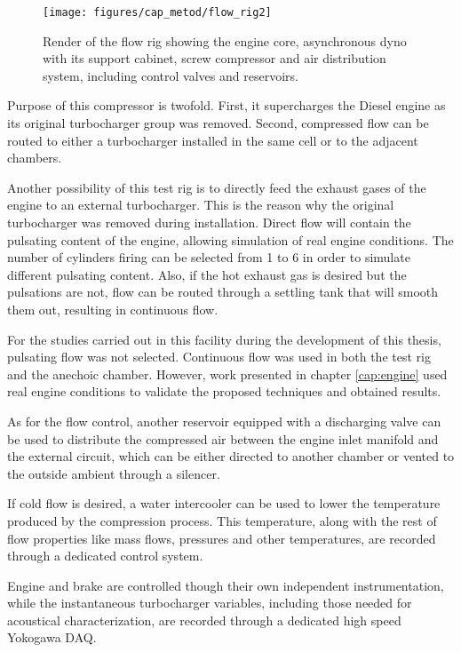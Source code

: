 \begin{figure}[b!]
\centering
\texttt{[image: figures/cap\_metod/flow\_rig2]}
\caption{Render of the flow rig showing the engine core, asynchronous dyno with its support cabinet, screw compressor and air distribution system, including control valves and reservoirs.}
\label{fig:flowrig_render}
\end{figure}

Purpose of this compressor is twofold. First, it supercharges the Diesel engine as its original turbocharger group was removed. Second, compressed flow can be routed to either a turbocharger installed in the same cell or to the adjacent chambers.

Another possibility of this test rig is to directly feed the exhaust gases of the engine to an external turbocharger. This is the reason why the original turbocharger was removed during installation. Direct flow will contain the pulsating content of the engine, allowing simulation of real engine conditions.
The number of cylinders firing can be selected from 1 to 6 in order to simulate different pulsating content. Also, if the hot exhaust gas is desired but the pulsations are not, flow can be routed through a settling tank that will smooth them out, resulting in continuous flow.

For the studies carried out in this facility during the development of this thesis, pulsating flow was not selected. Continuous flow was used in both the test rig and the anechoic chamber. However, work presented in chapter \ref{cap:engine} used real engine conditions to validate the proposed techniques and obtained results.

As for the flow control, another reservoir equipped with a discharging valve can be used to distribute the compressed air between the engine inlet manifold and the external circuit, which can be either directed to another chamber or vented to the outside ambient through a silencer.

If cold flow is desired, a water intercooler can be used to lower the temperature produced by the compression process. This temperature, along with the rest of flow properties like mass flows, pressures and other temperatures, are recorded through a dedicated control system.

Engine and brake are controlled though their own independent instrumentation, while the instantaneous turbocharger variables, including those needed for acoustical characterization, are recorded through a dedicated high speed Yokogawa DAQ.

